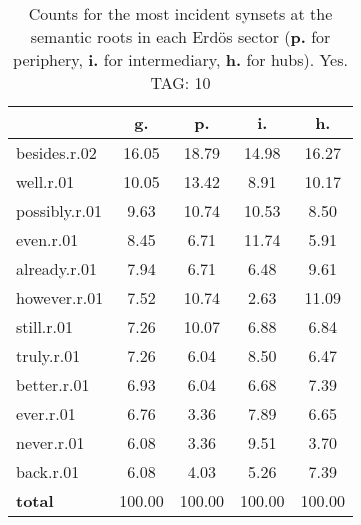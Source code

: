 \begin{table}[h!]
\begin{center}
\begin{tabular}{| l || c | c | c | c |}\hline
 & {\bf g.} & {\bf p.} & {\bf i.} & {\bf h.} \\\hline\hline
besides.r.02 & 16.05  & 18.79  & 14.98  & 16.27 \\\hline
well.r.01 & 10.05  & 13.42  & 8.91  & 10.17 \\\hline
possibly.r.01 & 9.63  & 10.74  & 10.53  & 8.50 \\\hline
even.r.01 & 8.45  & 6.71  & 11.74  & 5.91 \\\hline
already.r.01 & 7.94  & 6.71  & 6.48  & 9.61 \\\hline
however.r.01 & 7.52  & 10.74  & 2.63  & 11.09 \\\hline
still.r.01 & 7.26  & 10.07  & 6.88  & 6.84 \\\hline
truly.r.01 & 7.26  & 6.04  & 8.50  & 6.47 \\\hline
better.r.01 & 6.93  & 6.04  & 6.68  & 7.39 \\\hline
ever.r.01 & 6.76  & 3.36  & 7.89  & 6.65 \\\hline
never.r.01 & 6.08  & 3.36  & 9.51  & 3.70 \\\hline
back.r.01 & 6.08  & 4.03  & 5.26  & 7.39 \\\hline\hline
{{\bf total}} & 100.00  & 100.00  & 100.00  & 100.00 \\\hline
\end{tabular}
\caption{Counts for the most incident synsets at the semantic roots in each Erd\"os sector ({\bf p.} for periphery, {\bf i.} for intermediary, {\bf h.} for hubs). Yes. TAG: 10}
\end{center}
\end{table}